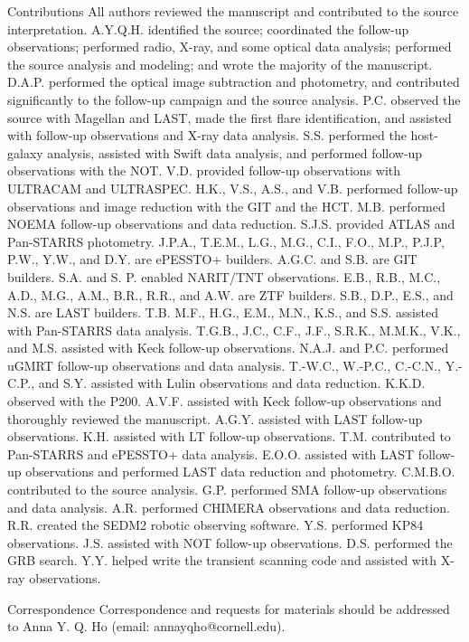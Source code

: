 \documentclass{nature_plusfigure}
\begin{document}
\begin{addendum}
\item[Contributions] 
All authors reviewed the manuscript and contributed to the source interpretation.
A.Y.Q.H. identified the source; coordinated the follow-up observations; performed radio, X-ray, and some optical data analysis; performed the source analysis and modeling; and wrote the majority of the manuscript. D.A.P. performed the optical image subtraction and photometry, and contributed significantly to the follow-up campaign and the source analysis. P.C. observed the source with Magellan and LAST, made the first flare identification, and assisted with follow-up observations and X-ray data analysis. S.S. performed the host-galaxy analysis, assisted with Swift data analysis, and performed follow-up observations with the NOT. V.D. provided follow-up observations with ULTRACAM and ULTRASPEC. H.K., V.S., A.S., and V.B. performed follow-up observations and image reduction with the GIT and the HCT. M.B. performed NOEMA follow-up observations and data reduction. S.J.S. provided ATLAS and Pan-STARRS photometry. J.P.A., T.E.M., L.G., M.G., C.I., F.O., M.P., P.J.P, P.W., Y.W., and D.Y. are ePESSTO+ builders. A.G.C. and S.B. are GIT builders. S.A. and S. P. enabled NARIT/TNT observations. E.B., R.B., M.C., A.D., M.G., A.M., B.R., R.R., and A.W. are ZTF builders. S.B., D.P., E.S., and N.S. are LAST builders. T.B. M.F., H.G., E.M., M.N., K.S., and S.S. assisted with Pan-STARRS data analysis. T.G.B., J.C., C.F., J.F., S.R.K., M.M.K., V.K., and M.S. assisted with Keck follow-up observations. N.A.J. and P.C. performed uGMRT follow-up observations and data analysis. T.-W.C., W.-P.C., C.-C.N., Y.-C.P., and S.Y. assisted with Lulin observations and data reduction. K.K.D. observed with the P200. A.V.F. assisted with Keck follow-up observations and thoroughly reviewed the manuscript. A.G.Y. assisted with LAST follow-up observations. K.H. assisted with LT follow-up observations. T.M. contributed to Pan-STARRS and ePESSTO+ data analysis. E.O.O. assisted with LAST follow-up observations and performed LAST data reduction and photometry. C.M.B.O. contributed to the source analysis. G.P. performed SMA follow-up observations and data analysis. A.R. performed CHIMERA observations and data reduction. R.R. created the SEDM2 robotic observing software. Y.S. performed KP84 observations. J.S. assisted with NOT follow-up observations. D.S. performed the GRB search. Y.Y. helped write the transient scanning code and assisted with X-ray observations.


 \item[Correspondence] Correspondence and requests for materials
should be addressed to Anna Y. Q. Ho (email: annayqho@cornell.edu).


\end{addendum}
\end{document}

